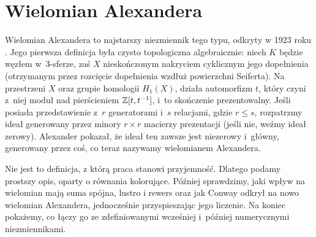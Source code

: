 
\section{Wielomian Alexandera}
%

Wielomian Alexandera to najstarszy niezmiennik tego typu, odkryty w 1923 roku \cite{alexander23}.
Jego pierwsza definicja była czysto topologiczna algebraicznie: niech $K$ będzie węzłem w~3-sferze, zaś $X$ nieskończonym nakryciem cyklicznym jego dopełnienia (otrzymanym przez rozcięcie dopełnienia wzdłuż powierzchni Seiferta).
Na przestrzeni $X$ oraz grupie homologii $H_1(X)$, działa automorfizm $t$, który czyni z~niej moduł nad pierścieniem $\mathbb Z[t, t^{-1}]$, i~to skończenie prezentowalny.
Jeśli posiada przedstawienie z~$r$ generatorami i~$s$ relacjami, gdzie $r \le s$, rozpatrzmy ideał generowany przez minory $r \times r$ macierzy prezentacji (jeśli nie, weźmy ideał zerowy).
Alexander pokazał, że ideał ten zawsze jest niezerowy i~główny, generowany przez coś, co teraz nazywamy wielomianem Alexandera.

Nie jest to definicja, z którą praca stanowi przyjemność.
Dlatego podamy prostszy opis, oparty o równania kolorujące.
Później sprawdzimy, jaki wpływ na wielomian mają suma spójna, lustro i rewers oraz jak Conway odkrył na nowo wielomian Alexandera, jednocześnie przyspieszając jego liczenie.
Na koniec pokażemy, co łączy go ze zdefiniowanymi wcześniej i~później numerycznymi niezmiennikami.













%


